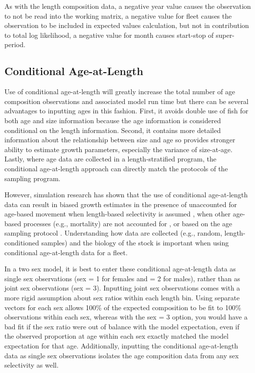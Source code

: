 As with the length composition data, a negative year value causes the observation to not be read into the working matrix, a negative value for fleet causes the observation to be included in expected values calculation, but not in contribution to total log likelihood, a negative value for month causes start-stop of super-period.


\subsection{Conditional Age-at-Length}
Use of conditional age-at-length will greatly increase the total number of age composition observations and associated model run time but there can be several advantages to inputting ages in this fashion.  First, it avoids double use of fish for both age and size information because the age information is considered conditional on the length information.  Second, it contains more detailed information about the relationship between size and age so provides stronger ability to estimate growth parameters, especially the variance of size-at-age. Lastly, where age data are collected in a length-stratified program, the conditional age-at-length approach can directly match the protocols of the sampling program.

However, simulation research has shown that the use of conditional age-at-length data can result in biased growth estimates in the presence of unaccounted for age-based movement when length-based selectivity is assumed \citep{lee-effects-2017}, when other age-based processes (e.g., mortality) are not accounted for \citep{lee-use-2019}, or based on the age sampling protocol \citep{piner-evaluation-2016}.  Understanding how data are collected (e.g., random, length-conditioned samples) and the biology of the stock is important when using conditional age-at-length data for a fleet.   

In a two sex model, it is best to enter these conditional age-at-length data as single sex observations (sex = 1 for females and = 2 for males), rather than as joint sex observations (sex = 3). Inputting joint sex observations comes with a more rigid assumption about sex ratios within each length bin. Using separate vectors for each sex allows 100\% of the expected composition to be fit to 100\% observations within each sex, whereas with the sex = 3 option, you would have a bad fit if the sex ratio were out of balance with the model expectation, even if the observed proportion at age within each sex exactly matched the model expectation for that age.  Additionally, inputting the conditional age-at-length data as single sex observations isolates the age composition data from any sex selectivity as well.

